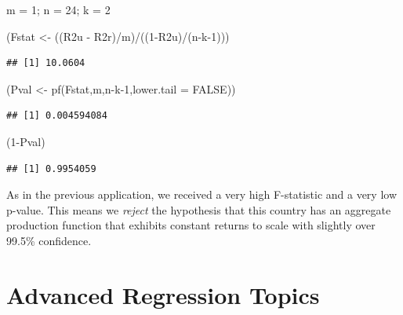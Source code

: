\documentclass[
]{book}
\newenvironment{Shaded}{\begin{snugshade}}{\end{snugshade}}
\newcommand{\AttributeTok}[1]{\textcolor[rgb]{0.77,0.63,0.00}{#1}}
\newcommand{\ConstantTok}[1]{\textcolor[rgb]{0.00,0.00,0.00}{#1}}
\newcommand{\DecValTok}[1]{\textcolor[rgb]{0.00,0.00,0.81}{#1}}
\newcommand{\FunctionTok}[1]{\textcolor[rgb]{0.00,0.00,0.00}{#1}}
\newcommand{\NormalTok}[1]{#1}
\newcommand{\OtherTok}[1]{\textcolor[rgb]{0.56,0.35,0.01}{#1}}
\newcommand{\SpecialCharTok}[1]{\textcolor[rgb]{0.00,0.00,0.00}{#1}}
\begin{document}
\begin{Shaded}
\begin{Highlighting}[]
\NormalTok{m }\OtherTok{=} \DecValTok{1}\NormalTok{; n }\OtherTok{=} \DecValTok{24}\NormalTok{; k }\OtherTok{=} \DecValTok{2}

\NormalTok{(Fstat }\OtherTok{\textless{}{-}}\NormalTok{ ((R2u }\SpecialCharTok{{-}}\NormalTok{ R2r)}\SpecialCharTok{/}\NormalTok{m)}\SpecialCharTok{/}\NormalTok{((}\DecValTok{1}\SpecialCharTok{{-}}\NormalTok{R2u)}\SpecialCharTok{/}\NormalTok{(n}\SpecialCharTok{{-}}\NormalTok{k}\DecValTok{{-}1}\NormalTok{)))}
\end{Highlighting}
\end{Shaded}

\begin{verbatim}
## [1] 10.0604
\end{verbatim}

\begin{Shaded}
\begin{Highlighting}[]
\NormalTok{(Pval }\OtherTok{\textless{}{-}} \FunctionTok{pf}\NormalTok{(Fstat,m,n}\SpecialCharTok{{-}}\NormalTok{k}\DecValTok{{-}1}\NormalTok{,}\AttributeTok{lower.tail =} \ConstantTok{FALSE}\NormalTok{))}
\end{Highlighting}
\end{Shaded}

\begin{verbatim}
## [1] 0.004594084
\end{verbatim}

\begin{Shaded}
\begin{Highlighting}[]
\NormalTok{(}\DecValTok{1}\SpecialCharTok{{-}}\NormalTok{Pval)}
\end{Highlighting}
\end{Shaded}

\begin{verbatim}
## [1] 0.9954059
\end{verbatim}

As in the previous application, we received a very high F-statistic and a very low p-value. This means we \emph{reject} the hypothesis that this country has an aggregate production function that exhibits constant returns to scale with slightly over 99.5\% confidence.

\hypertarget{Advanced}{%
\chapter{Advanced Regression Topics}\label{Advanced}}
\end{document}
